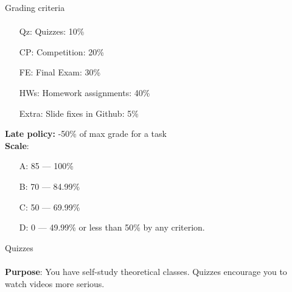 \documentclass[aspectratio=169]{beamer}
\begin{document}
\begin{frame}[t]{Grading criteria}
    \framesubtitle{}
    \vspace{-0.6cm}
    \begin{itemize}
        \item[Qz:] Quizzes: 10\% 
        \item[CP:] Competition: 20\%
        \item[FE:] Final Exam: 30\%
        \item[HWs:] Homework assignments: 40\%
        \item[Extra:] Slide fixes in Github: 5\% 
    \end{itemize}
    \textbf{Late policy:} -50\% of max grade for a task \\
    \textbf{Scale}:
    \begin{itemize}
        \item[A:] 85 --- 100\%
        \item[B:] 70 --- 84.99\%
        \item[C:] 50 --- 69.99\%
        \item[D:] 0 --- 49.99\% or less than 50\% by any criterion.
    \end{itemize}
\end{frame}

\begin{frame}[t]{Quizzes}
\framesubtitle{}
    \textbf{Purpose}: You have self-study theoretical classes. Quizzes encourage you to watch videos more serious.
\end{frame}
\end{document}

